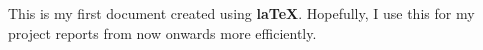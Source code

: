 \documentclass[12pt]{article}
\begin{document}
\color{red}
This is my first document created using \textbf{laTeX}. Hopefully, I use this for my project reports from now onwards more efficiently.
\end{document}
